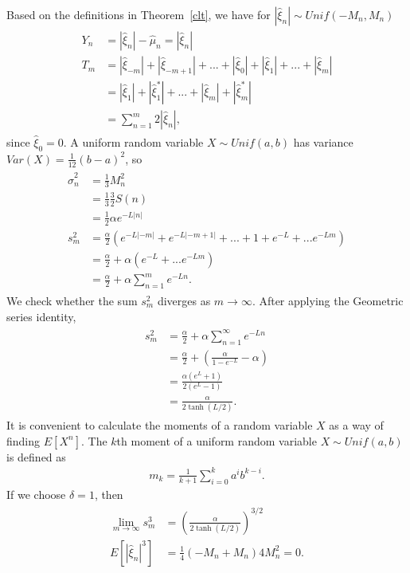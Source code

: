 Based on the definitions in Theorem~\ref{clt}, we have for
$|\hat{\xi}_n| \sim Unif(-M_n,M_n)$
\begin{align*}
\begin{split}
Y_n &= |\hat{\xi}_n| - \hat{\mu}_n = |\hat{\xi}_n|\\
T_m &= |\hat{\xi}_{-m}|+|\hat{\xi}_{-m+1}|+ ...+|\hat{\xi}_{0}|+|\hat{\xi}_{1}|+...+|\hat{\xi}_{m}|\\
&=
|\hat{\xi}_{1}|+|\hat{\xi}_{1}^*|+...+|\hat{\xi}_{m}|+|\hat{\xi}_{m}^*|\\
&= \sum_{n=1}^{m} 2|\hat{\xi}_{n}|,
\end{split}
\end{align*}
since $\hat{\xi}_{0} = 0$. A uniform random variable $X\sim Unif(a,b)$ has variance
$Var(X) = \frac{1}{12}(b-a)^2$, so
\begin{align*}
\begin{split}
\hat{\sigma}_n^2 &= \frac{1}{3}M_n^2\\
&= \frac{1}{3}\frac{3}{2}S(n)\\
&= \frac{1}{2}\alpha e^{-L|n|}\\
s_m^2 &= \frac{\alpha}{2}\left(e^{-L|-m|}+e^{-L|-m+1|}+...+1+e^{-L}+...e^{-Lm} \right)\\
&= \frac{\alpha}{2} + \alpha \left(e^{-L}+...e^{-Lm} \right)\\
&=\frac{\alpha}{2} +\alpha\sum_{n=1}^m e^{-Ln}.
\end{split}
\end{align*}
We check whether the sum $s_m^2$ diverges as $m \to \infty$. After applying the Geometric series identity,
\begin{align*}
\begin{split}
s_m^2 &=\frac{\alpha}{2} +\alpha\sum_{n=1}^\infty e^{-Ln}\\
&= \frac{\alpha}{2} + \left( \frac{\alpha}{1-e^{-L}}- \alpha\right)\\
&= \frac{\alpha(e^L+1)}{2(e^L-1)}\\
&= \frac{\alpha}{2 \tanh(L/2)}.
\end{split}
\end{align*}
It is convenient to calculate the moments of a random variable $X$ as a
way of finding $E[X^n]$. The $k$th moment of a uniform random variable $X \sim
Unif(a,b)$ is defined as 
\begin{align*}
m_k = \frac{1}{k+1}\sum_{i=0}^ka^ib^{k-i}.
\end{align*}
If we choose $\delta=1$, then 
\begin{align*}
\begin{split}
\lim_{m \to \infty}s_m^3&=\left(\frac{\alpha}{2 \tanh(L/2)}\right)^{3/2}\\
E[|\hat{\xi}_{n}|^3] &=\frac{1}{4} (-M_n + M_n)4M_n^2 = 0.
\end{split}
\end{align*}
